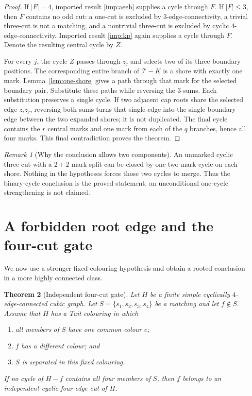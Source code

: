 \documentclass[11pt]{article}
\newtheorem{theorem}{Theorem}[section]
\theoremstyle{definition}
\theoremstyle{remark}
\newtheorem{remark}[theorem]{Remark}
\begin{document}
\begin{proof}
If \(|F|=4\), imported result \ref{imp:aeeh} supplies a cycle through
\(F\).  If \(|F|\leq3\), then \(F\) contains no odd cut: a one-cut is
excluded by 3-edge-connectivity, a trivial three-cut is not a matching,
and a nontrivial three-cut is excluded by cyclic
\(4\)-edge-connectivity.  Imported result \ref{imp:kp} again supplies a
cycle through \(F\).  Denote the resulting central cycle by \(Z\).

For every \(j\), the cycle \(Z\) passes through \(z_j\) and selects two
of its three boundary positions.  The corresponding entire branch of
\(\mathcal T-K\) is a shore with exactly one mark.
Lemma~\ref{lem:one-shore} gives a path through that mark for the selected
boundary pair.  Substitute these paths while reversing the 3-sums.
Each substitution preserves a single cycle.  If two adjacent cap roots
share the selected edge \(z_i z_j\), reversing both sums turns that
single edge into the single boundary edge between the two expanded
shores; it is not duplicated.  The final cycle contains the \(r\)
central marks and one mark from each of the \(q\) branches, hence all
four marks.  This final contradiction proves the theorem.
\end{proof}

\begin{remark}[Why the conclusion allows two components]
An unmarked cyclic three-cut with a \(2+2\) mark split can be closed by
one two-mark cycle on each shore.  Nothing in the hypotheses forces
those two cycles to merge.  Thus the binary-cycle conclusion is the
proved statement; an unconditional one-cycle strengthening is not
claimed.
\end{remark}

\section{A forbidden root edge and the four-cut gate}

We now use a stronger fixed-colouring hypothesis and obtain a rooted
conclusion in a more highly connected class.

\begin{theorem}[Independent four-cut gate]\label{thm:gate}
Let \(H\) be a finite simple cyclically \(4\)-edge-connected cubic graph.
Let \(S=\{s_1,s_2,s_3,s_4\}\) be a matching and let \(f\notin S\).
Assume that \(H\) has a Tait colouring in which
\begin{enumerate}[label=(\roman*),leftmargin=2.4em]
\item all members of \(S\) have one common colour \(c\);
\item \(f\) has a different colour; and
\item \(S\) is separated in this fixed colouring.
\end{enumerate}
If no cycle of \(H-f\) contains all four members of \(S\), then \(f\)
belongs to an independent cyclic four-edge cut of \(H\).
\end{theorem}
\end{document}
